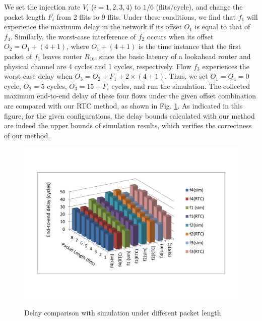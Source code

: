 \documentclass[preprint]{elsarticle}
\begin{document}
We set the injection rate $V_i$ ($i=1,2,3,4$) to $1/6$ (flits/cycle), and change the packet length $F_i$ from 2 flits to 9 flits. Under these conditions, we find that $f_1$ will experience the maximum delay in the network if its offset $O_1$ is equal to that of $f_4$. Similarly, the worst-case interference of $f_2$ occurs when its offset $O_2=O_1+(4+1)$, where $O_1+(4+1)$ is the time instance that the first packet of $f_1$ leaves router $R_{16}$, since the basic latency of a lookahead router and physical channel are 4 cycles and 1 cycles, respectively. Flow $f_3$ experiences the worst-case delay when $O_3=O_2+F_1+2\times(4+1)$. Thus, we set $O_1=O_4=0$ cycle, $O_2=5$ cycles, $O_3=15+F_i$ cycles, and run the simulation. The collected maximum end-to-end delay of these four flows under the given offset combination are compared with our RTC method, as shown in Fig. \ref{rtcvssim}. As indicated in this figure, for the given configurations, the delay bounds calculated with our method are indeed the upper bounds of simulation results, which verifies the correctness of our method.
\begin{figure}
  \centering
  \includegraphics[scale=0.5]{figures/rtcvssim.pdf}\\
  \caption{Delay comparison with simulation under different packet length}\label{rtcvssim}
\end{figure}
\end{document}
